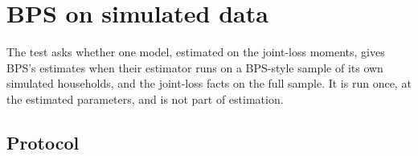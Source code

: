 \documentclass[11pt]{article}
\newcommand{\1}{\mathbf{1}}
\begin{document}
\section{BPS on simulated data}\label{sec:bps}

The test asks whether one model, estimated on the joint-loss moments, gives BPS's estimates when their estimator runs on
a BPS-style sample of its own simulated households, and the joint-loss facts on the full sample. It is run once, at the
estimated parameters, and is not part of estimation.

\subsection{Protocol}
\end{document}
